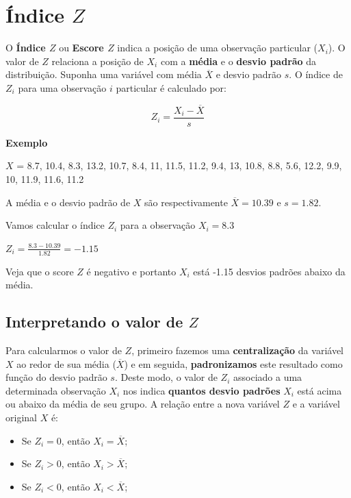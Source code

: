 \documentclass[
]{book}
\providecommand{\tightlist}{%
  \setlength{\itemsep}{0pt}\setlength{\parskip}{0pt}}
\begin{document}
\hypertarget{uxedndice-z}{%
\section{\texorpdfstring{Índice \(Z\)}{Índice Z}}\label{uxedndice-z}}

O \textbf{Índice \(Z\)} ou \textbf{Escore \(Z\)} indica a posição de uma observação particular (\(X_i\)). O valor de \(Z\) relaciona a posição de \(X_i\) com a \textbf{média} e o \textbf{desvio padrão} da distribuição. Suponha uma variável com média \(\overline{X}\) e desvio padrão \(s\). O índice de \(Z_i\) para uma observação \(i\) particular é calculado por:

\[Z_i = \frac{X_i - \overline{X}}{s}\]

\textbf{Exemplo}

\(X\) = 8.7, 10.4, 8.3, 13.2, 10.7, 8.4, 11, 11.5, 11.2, 9.4, 13, 10.8, 8.8, 5.6, 12.2, 9.9, 10, 11.9, 11.6, 11.2

A média e o desvio padrão de \(X\) são respectivamente \(\overline{X} = 10.39\) e \(s = 1.82\).

Vamos calcular o índice \(Z_i\) para a observação \(X_i = 8.3\)

\(Z_i = \frac{8.3 - 10.39}{1.82} = -1.15\)

Veja que o score \(Z\) é negativo e portanto \(X_i\) está -1.15 desvios padrões abaixo da média.

\hypertarget{interpretando-o-valor-de-z}{%
\subsection{\texorpdfstring{Interpretando o valor de \(Z\)}{Interpretando o valor de Z}}\label{interpretando-o-valor-de-z}}

Para calcularmos o valor de \(Z\), primeiro fazemos uma \textbf{centralização} da variável \(X\) ao redor de sua média (\(\overline{X}\)) e em seguida, \textbf{padronizamos} este resultado como função do desvio padrão \(s\). Deste modo, o valor de \(Z_i\) associado a uma determinada observação \(X_i\) nos indica \textbf{quantos desvio padrões} \(X_i\) está acima ou abaixo da média de seu grupo. A relação entre a nova variável \(Z\) e a variável original \(X\) é:

\begin{itemize}
\tightlist
\item
  Se \(Z_i = 0\), então \(X_i = \overline{X}\);
\item
  Se \(Z_i > 0\), então \(X_i > \overline{X}\);
\item
  Se \(Z_i < 0\), então \(X_i < \overline{X}\);
\end{itemize}
\end{document}
